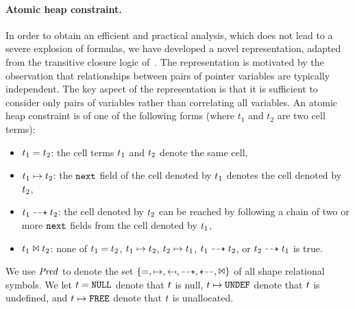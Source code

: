 \paragraph{Atomic heap constraint.}
In order to obtain an efficient and practical analysis, which does not
lead to a severe explosion of formulas, we have developed a novel
representation, adapted from the transitive closure logic
of~\cite{BiRa:vmcai06}. %
The representation is motivated by the observation that relationships
between pairs of pointer variables are typically independent.
%
The key aspect of the representation is that it is sufficient to
consider only pairs of variables rather than correlating all variables.
%
An atomic heap constraint is of one of the following forms %
(where $t_1$ and $t_2$ are two cell terms): %
\begin{itemize}
\item $t_1 = t_2$: the cell terms $t_1$
  and $t_2$ denote the same cell,
\item ${t_1}\mapsto{t_2}$: the ${\tt next}$
  field of the cell denoted by $t_1$ denotes the cell denoted by
  $t_2$,
\item ${t_1}\dashrightarrow{t_2}$: the cell denoted by
  $t_2$ can be reached by following a chain of two or more
  ${\tt next}$ fields from the cell denoted by $t_1$,
\item
$t_1 \Join t_2$: none of 
$t_1 = t_2$, %
${t_1}\mapsto{t_2}$, %
${t_2}\mapsto{t_1}$, %
${t_1}\dashrightarrow{t_2}$, or %
${t_2}\dashrightarrow{t_1}$ is true.
\end{itemize}
We use $\mathit{Pred}$ to denote the set
$\{=,\mapsto,\mapsfrom,\dashrightarrow,\dashleftarrow,\Join\}$ of all
shape relational symbols. %
We let ${t}={\mbox{{\tt NULL}}}$ denote that $t$ is
null, ${t}\mapsto{\mbox{{\tt UNDEF}}}$ denote that $t$ is
undefined, and ${t}\mapsto{\mbox{{\tt FREE}}}$ denote that
$t$ is unallocated.

%
%


%   
